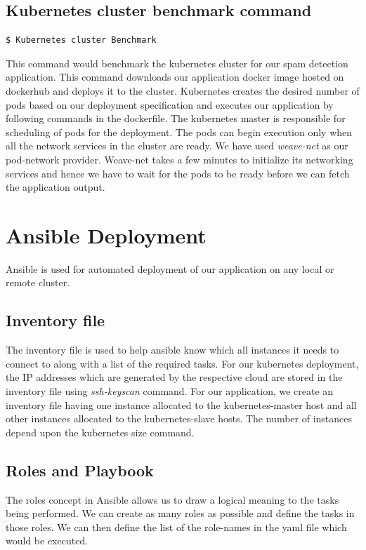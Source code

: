 \documentclass[9pt,twocolumn,twoside]{../../styles/osajnl}
\begin{document}
{\subsection{Kubernetes cluster benchmark command}
\begin{verbatim}
$ Kubernetes cluster Benchmark
\end{verbatim}

\noindent
This command would benchmark the kubernetes cluster for our spam
detection application. This command downloads our application docker
image hosted on dockerhub and deploys it to the cluster. Kubernetes
creates the desired number of pods based on our deployment
specification and executes our application by following commands in
the dockerfile. The kubernetes master is responsible for scheduling of
pods for the deployment. The pods can begin execution only when all
the network services in the cluster are ready. We have used
\emph{weave-net} as our pod-network provider. Weave-net takes a few
minutes to initialize its networking services and hence we have to
wait for the pods to be ready before we can fetch the application
output.

\section{Ansible Deployment}
Ansible is used for automated deployment of our application on any
local or remote cluster.

\subsection{Inventory file}
The inventory file is used to help ansible know which all instances it
needs to connect to along with a list of the required tasks. For our
kubernetes deployment, the IP addresses which are generated by the
respective cloud are stored in the inventory file using
\emph{ssh-keyscan} command. For our application, we create an
inventory file having one instance allocated to the kubernetes-master
host and all other instances allocated to the kubernetes-slave
hosts. The number of instances depend upon the kubernetes size
command.

\subsection{Roles and Playbook}
The roles concept in Ansible allows us to draw a logical meaning to the
tasks being performed. We can create as many roles as possible and
define the tasks in those roles. We can then define the list of the
role-names in the yaml file which would be executed.\newline

}
\end{document}

